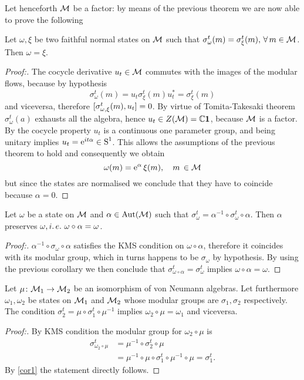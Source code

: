 Let henceforth $\mathcal{M}$ be a factor: by means of the previous
theorem we are now able to prove the following 
\begin{corollary}
\label{cor1}
Let $\omega,\xi$ be two faithful normal states on $\mathcal{M}$ 
such that $\sigma^t_{\omega}(m)=\sigma^t_{\xi}(m),\,\forall\,m\in\mathcal{M}$.
Then $\omega=\xi$.
 \begin{proof}[Proof:]
 The cocycle derivative $u_t\in\mathcal{M}$ commutes with the images of the
 modular flows, because by hypothesis
 \[
 \sigma^t_{\omega}(m)=u_t\sigma^t_{\xi}(m)u_t^*=\sigma^t_{\xi}(m)
 \]
 and viceversa, therefore $[\sigma^t_{\omega,\xi}(m),u_t]=0$. 
 By virtue  of Tomita-Takesaki theorem $\sigma^t_{\omega}(a)$ 
 exhausts all the algebra,  hence $u_t\in Z(\mathcal{M})=\mathbb{C}\bm{1}$, because 
 $\mathcal{M}$ is a factor. By the cocycle property $u_t$ is a continuous
 one parameter group, and being unitary implies $u_t=\operatorname{e}^{it\alpha}\in\textrm{S}^1$. 
 This allows the assumptions of the previous theorem to hold 
 and consequently we obtain
 \[
 \omega(m)=\operatorname{e}^{\alpha}\xi(m),\quad m\,\in\mathcal{M}
 \]
 but since the states are normalised we conclude that they have to
 coincide because $\alpha=0$.\qedhere
 \end{proof}
\end{corollary}
\begin{corollary}
\label{cor2}
Let $\omega$ be a state on $\mathcal{M}$ and $\alpha\in\operatorname{Aut}(\mathcal{M})$ such
that $\sigma_{\omega}^t=\alpha^{-1}\circ\sigma^t_{\omega}\circ\alpha$.
Then $\alpha$ preserves $\omega,\ie\ \omega\circ\alpha=\omega$.
 \begin{proof}[Proof:]
 $\alpha^{-1}\circ\sigma_{\omega}\circ\alpha$ satisfies the \ac{KMS} 
 condition on $\omega\circ\alpha$, therefore it coincides with its
 modular group, which in turns happens to be $\sigma_{\omega}$ by
 hypothesis. By using the previous corollary we then conclude that
 $\sigma^t_{\omega\circ\alpha}=\sigma^t_{\omega}$ implies 
 $\omega\circ\alpha=\omega$.\qedhere
 \end{proof} 
\end{corollary}
\begin{corollary}
\label{cor3}
Let $\mu\colon\mathcal{M}_1\to\mathcal{M}_2$ be an isomorphism of von Neumann algebras.
Let furthermore $\omega_1,\omega_2$ be states on $\mathcal{M}_1$ and 
$\mathcal{M}_2$ whose modular groups are $\sigma_1,\sigma_2$ respectively. 
The condition $\sigma_2^t=\mu\circ\sigma_1^t\circ\mu^{-1}$ implies 
$\omega_2\circ\mu=\omega_1$ and viceversa.
 \begin{proof}[Proof:]
 By \ac{KMS} condition the modular group for $\omega_2\circ\mu$ is
 \begin{align*}
 \sigma_{\omega_2\circ\mu}^t&=\mu^{-1}\circ\sigma_2^t\circ\mu\\
 &=\mu^{-1}\circ\mu\circ\sigma^t_1\circ\mu^{-1}\circ\mu=\sigma^t_1.
 \end{align*}
 By \ref{cor1} the statement directly follows.
 \end{proof}
\end{corollary}
